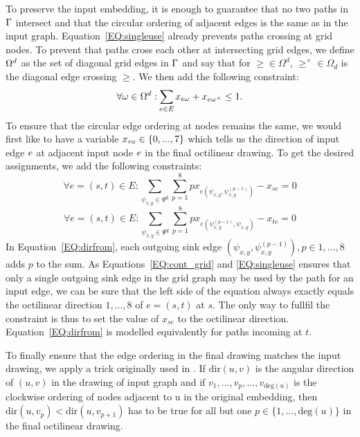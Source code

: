 \documentclass{sig-alternate-sigmod09}
\begin{document}
To preserve the input embedding, it is enough to guarantee that no two paths in $\Gamma$ intersect and that the circular ordering of adjacent edges is the same as in the input graph.
Equation~\ref{EQ:singleuse} already prevents paths crossing at grid nodes.
To prevent that paths cross each other at intersecting grid edges, we define $\Omega^d$ as the set of diagonal grid edges in $\Gamma$ and say that for $\ge \in \Omega^d$, $\ge^{\times} \in \Omega_d$ is the diagonal edge crossing $\ge$. 
We then add the following constraint:
%
\begin{equation}
  \forall \omega \in \Omega^d: \Psum{\ie \in \iE} \geused{\ie}{\ge} + \geused{\ie}{\ge^{\times}} \leq 1. \label{EQ:crossing}
\end{equation}
%
To ensure that the circular edge ordering at nodes remains the same, we would first like to have a variable $x_{ve} \in \{0, ..., 7\}$ which tells us the direction of input edge $e$ at adjacent input node $e$ in the final octilinear drawing.
To get the desired assignments, we add the following constraints:
%
\begin{equation}
  \forall e = (s, t) \in E: \sum_{\psi_{x, y} \in \Psi^g} \sum_{p = 1}^8 p x_{e(\psi_{x, y},  \psi_{x, y}^{(p - 1)})} - x_{se} = 0\label{EQ:dirfrom}
\end{equation}
\begin{equation}
  \forall e = (s, t) \in E: \sum_{\psi_{x, y} \in \Psi^g} \sum_{p = 1}^8 p x_{e(\psi_{x, y}^{(p - 1)}, \psi_{x, y})} - x_{te} = 0\label{EQ:dirto}
\end{equation}
%
In Equation~\ref{EQ:dirfrom}, each outgoing sink edge $(\psi_{x, y},  \psi_{x, y}^{(p - 1)}), p \in {1, ..., 8}$ adds $p$ to the sum.
As Equations~\ref{EQ:cont_grid} and \ref{EQ:singleuse} ensures that only a single outgoing sink edge in the grid graph may be used by the path for an input edge, we can be sure that the left side of the equation always exactly equals the octilinear direction $1, ..., 8$ of $e = (s, t)$ at $s$.
The only way to fullfil the constraint is thus to set the value of $x_{se}$ to the octilinear direction.
Equation~\ref{EQ:dirfrom} is modelled equivalently for paths incoming at $t$.

To finally ensure that the edge ordering in the final drawing matches the input drawing, we apply a trick originally used in \cite{noellenburg}.
If $\text{dir}(u, v)$ is the angular direction of $(u, v)$ in the drawing of input graph and if $v_1, ..., v_p, ..., v_{\text{deg}(u)}$ is the clockwise ordering of nodes adjacent to u in the original embedding, then $\text{dir}(u, v_p) < \text{dir}(u, v_{p + 1})$ has to be true for all but one $p \in \{1, ..., \text{deg}(u)\}$ in the final octilinear drawing.
\end{document}
